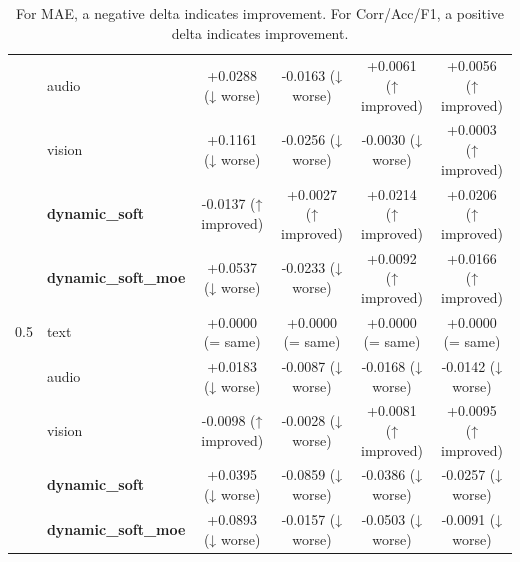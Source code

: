 \begin{table}[t]
\begin{tabular}{llcccc}
 & audio & +0.0288 (↓ worse) & -0.0163 (↓ worse) & +0.0061 (↑ improved) & +0.0056 (↑ improved) \\
 & vision & +0.1161 (↓ worse) & -0.0256 (↓ worse) & -0.0030 (↓ worse) & +0.0003 (↑ improved) \\
 & \textbf{dynamic_soft} & -0.0137 (↑ improved) & +0.0027 (↑ improved) & +0.0214 (↑ improved) & +0.0206 (↑ improved) \\
 & \textbf{dynamic_soft_moe} & +0.0537 (↓ worse) & -0.0233 (↓ worse) & +0.0092 (↑ improved) & +0.0166 (↑ improved) \\
\midrule
0.5 & text & +0.0000 (= same) & +0.0000 (= same) & +0.0000 (= same) & +0.0000 (= same) \\
 & audio & +0.0183 (↓ worse) & -0.0087 (↓ worse) & -0.0168 (↓ worse) & -0.0142 (↓ worse) \\
 & vision & -0.0098 (↑ improved) & -0.0028 (↓ worse) & +0.0081 (↑ improved) & +0.0095 (↑ improved) \\
 & \textbf{dynamic_soft} & +0.0395 (↓ worse) & -0.0859 (↓ worse) & -0.0386 (↓ worse) & -0.0257 (↓ worse) \\
 & \textbf{dynamic_soft_moe} & +0.0893 (↓ worse) & -0.0157 (↓ worse) & -0.0503 (↓ worse) & -0.0091 (↓ worse) \\
\bottomrule
\end{tabular}
\vspace{0.2em}
\caption*{For MAE, a negative delta indicates improvement. For Corr/Acc/F1, a positive delta indicates improvement.}
\end{table}
